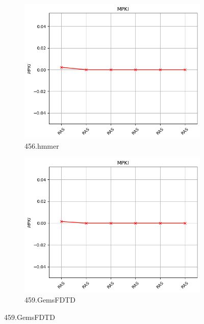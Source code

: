 \documentclass{article}
\begin{document}
\begin{figure}[H]
    \vspace{0.5cm} %

    \begin{subfigure}[b]{0.45\textwidth}
        \includegraphics[width=\textwidth]{figures/5_5/456.hmmer.cslab_branch_preds_ref.out.png}
        \caption{456.hmmer}
        \label{fig:plot75}
    \end{subfigure}
    \hfill
    \begin{subfigure}[b]{0.45\textwidth}
        \includegraphics[width=\textwidth]{figures/5_5/459.GemsFDTD.cslab_branch_preds_ref.out.png}
        \caption{459.GemsFDTD}
        \label{fig:plot76}
    \end{subfigure}


\end{figure}
\end{document}
